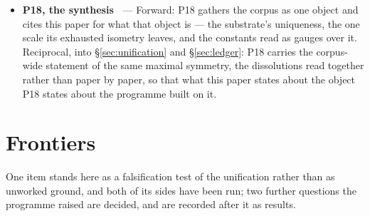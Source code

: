 \documentclass[11pt,a4paper]{article}
\theoremstyle{definition}
\begin{document}
\begin{itemize}
synthesis of the corpus's deductively forced consequences over this maximally
symmetric substrate --- the hot dense era the far side of a collapse the
substrate's own geometry already carries through the branch point, finite in the substrate's
curvature whatever the areal chart reports there.
Reciprocal, into \S\ref{sec:imaginary} and \S\ref{sec:shadows}: P16 lands the
\emph{lap} --- the conjugate branch of the slicing curve, reached through the
imaginary yet real, read forward as a previous universe's collapsed matter, the
\emph{cosmogenetic bead} the framework proves one closed curve~\cite{JanzenCRframework}
and a concrete instance of this paper's reached-through-the-imaginary principle
(its cosmic time runs off the real axis through a bounded contour while the areal
radius stays real at every point it lands on) ---
and returns the one quantitative consequence the synthesis adds beyond the
corpus's established results: the infalling matter, heated above the deuterium
bottleneck and re-expanded through it at the standard rate, runs a standard
nucleosynthesis that \emph{produces} the primordial light-element abundances
(helium-4 and deuterium at their observed values, the lithium problem shared
with $\Lambda$CDM). The Big Bang is thus no initial edge of the substrate but
a broken-symmetry shadow cast within it --- the substrate's maximal symmetry
read at the cosmogenesis rung, the abundances its fossil; its open edge the
last-percent precision of the nuclear rates.
\item \textbf{P18, the synthesis~\cite{JanzenSynthesis}} --- Forward: P18 gathers the corpus as one object and cites
this paper for what that object is --- the substrate's uniqueness, the one scale its exhausted isometry leaves,
and the constants read as gauges over it. Reciprocal, into \S\ref{sec:unification} and \S\ref{sec:ledger}: P18
carries the corpus-wide statement of the same maximal symmetry, the dissolutions read together rather than paper
by paper, so that what this paper states about the object P18 states about the programme built on it.
\end{itemize}

\section{Frontiers}\label{sec:frontiers}

One item stands here as a falsification test of the unification rather than as unworked ground, and both
of its sides have been run; two further questions the programme raised are decided, and are recorded after
it as results.
\end{document}
